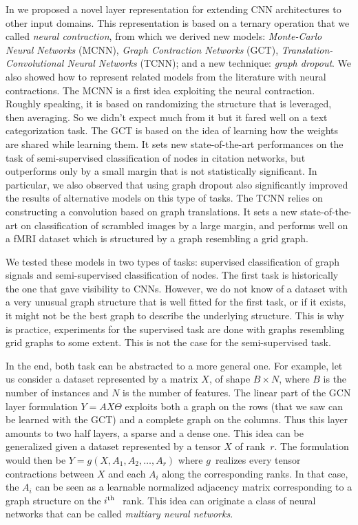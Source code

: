 In  we proposed a novel layer representation for extending CNN architectures to other input domains. This representation is based on a ternary operation that we called \emph{neural contraction}, from which we derived new models: \emph{Monte-Carlo Neural Networks} (MCNN), \emph{Graph Contraction Networks} (GCT), \emph{Translation-Convolutional Neural Networks} (TCNN); and a new technique: \emph{graph dropout}. We also showed how to represent related models from the literature with neural contractions. The MCNN is a first idea exploiting the neural contraction. Roughly speaking, it is based on randomizing the structure that is leveraged, then averaging. So we didn't expect much from it but it fared well on a text categorization task. The GCT is based on the idea of learning how the weights are shared while learning them. It sets new state-of-the-art performances on the task of semi-supervised classification of nodes in citation networks, but outperforms only by a small margin that is not statistically significant. In particular, we also observed that using graph dropout also significantly improved the results of alternative models on this type of tasks. The TCNN relies on constructing a convolution based on graph translations. It sets a new state-of-the-art on classification of scrambled images by a large margin, and performs well on a fMRI dataset which is structured by a graph resembling a grid graph.

\vspace{0.2cm}

We tested these models in two types of tasks: supervised classification of graph signals and semi-supervised classification of nodes. The first task is historically the one that gave visibility to CNNs. However, we do not know of a dataset with a very unusual graph structure that is well fitted for the first task, or if it exists, it might not be the best graph to describe the underlying structure. This is why is practice, experiments for the supervised task are done with graphs resembling grid graphs to some extent. This is not the case for the semi-supervised task.

\vspace{0.2cm}

In the end, both task can be abstracted to a more general one. For example, let us consider a dataset represented by a matrix $X$, of shape $B \times N$, where $B$ is the number of instances and $N$ is the number of features. The linear part of the GCN layer formulation $Y = A X \Theta$ exploits both a graph on the rows (that we saw can be learned with the GCT) and a complete graph on the columns. Thus this layer amounts to two half layers, a sparse and a dense one. This idea can be generalized given a dataset represented by a tensor $X$ of rank~$r$. The formulation would then be $Y = g(X, A_1, A_2, \ldots, A_r)$ where $g$~realizes every tensor contractions between $X$ and each $A_i$ along the corresponding ranks. In that case, the $A_i$ can be seen as a learnable normalized adjacency matrix corresponding to a graph structure on the $i\text{$^\text{th}$~}$ rank. This idea can originate a class of neural networks that can be called \emph{multiary neural networks}.

